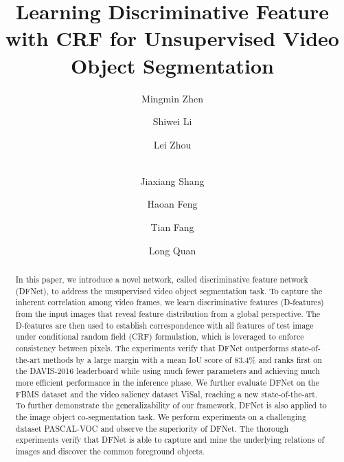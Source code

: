 \documentclass[runningheads]{llncs}
\begin{document}
\pagestyle{headings}
\mainmatter


\title{Learning Discriminative Feature with CRF for Unsupervised Video Object Segmentation} 



\author{Mingmin Zhen \and  Shiwei Li \and Lei Zhou  \and \\ Jiaxiang Shang \and Haoan Feng \and Tian Fang \and Long Quan}

\maketitle

\begin{abstract}
In this paper, we introduce a novel network, called discriminative feature network (DFNet), to address the unsupervised video object segmentation task. To capture the inherent correlation among video frames, we learn  discriminative features (D-features) from the input images that reveal feature distribution from a global perspective. The D-features are then used to establish correspondence with all features of test image under conditional random field (CRF) formulation, which is leveraged to enforce consistency between pixels.  The experiments verify that DFNet outperforms state-of-the-art methods by a large margin with a mean IoU score of 83.4\%  and ranks first on the DAVIS-2016 leaderboard while using much fewer parameters and achieving  much more efficient performance in the inference phase. We further evaluate DFNet on the FBMS dataset and the video saliency dataset ViSal, reaching a new state-of-the-art. To further demonstrate the generalizability of our framework, DFNet is also applied to the image object co-segmentation task. We perform experiments on a challenging dataset PASCAL-VOC  and observe the superiority of  DFNet. The thorough experiments verify that DFNet is able to capture and mine the underlying relations of images and discover the common foreground objects. 
\end{abstract}
\end{document}
